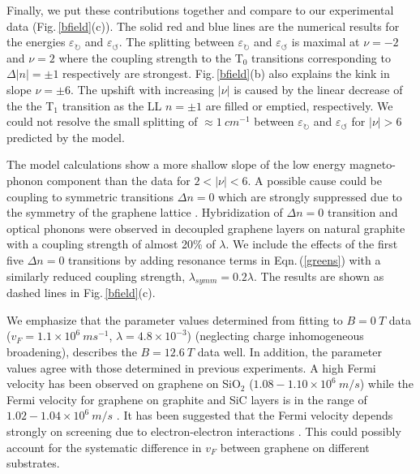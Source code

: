 \documentclass[prl,aps,superscriptaddress,showpacs,reprint]{revtex4-1}
\begin{document}
Finally,  we put these contributions together and compare to our experimental data (Fig.\,\ref{bfield}(c)). The solid red and blue lines are the numerical results for the energies $\varepsilon_\circlearrowright$ and $\varepsilon_\circlearrowleft$.
The splitting between $\varepsilon_\circlearrowright$ and $\varepsilon_\circlearrowleft$ is maximal at $\nu=-2$ and $\nu=2$ where the coupling strength to the T$_0$ transitions corresponding to $\Delta|n|=\pm1$ respectively are strongest. Fig.\,\ref{bfield}(b) also explains the kink in slope $\nu=\pm6$.  The upshift with increasing $|\nu|$  is  caused by the linear decrease of the the T$_1$ transition as the LL $n=\pm1 $ are filled or emptied, respectively. We could not resolve the small splitting of $\approx 1\: cm^{-1}$ between $\varepsilon_\circlearrowright$ and $\varepsilon_\circlearrowleft$ for $\left|\nu\right|>6$ predicted by the model.

The model calculations show a more shallow slope of the low energy magneto-phonon component than the data for $2 < \left|\nu\right| < 6$. A possible cause could be coupling to symmetric transitions $\Delta n = 0$ which are strongly suppressed due to the symmetry of the graphene lattice \cite{PhysRevB.84.235138}. Hybridization of $\Delta n =0$ transition and optical phonons were observed in decoupled graphene layers on natural graphite \cite{faugeras2011magneto,kuhne2012polarization} with a coupling strength of almost 20\% of $\lambda$. We include the effects of the first five $\Delta n = 0$ transitions by adding resonance terms in Eqn.\,(\ref{greens}) with a similarly reduced coupling strength, $\lambda_{symm} =0.2\lambda$. The results are shown as dashed lines in Fig.\,\ref{bfield}(c).

We emphasize that the parameter values determined from fitting to $B=0\: T$ data ($v_F=1.1\times 10^6\: ms^{-1}$, $\lambda=4.8\times 10^{-3}$)  (neglecting charge inhomogeneous broadening), describes the $B=12.6\: T$ data well. In addition, the parameter values agree with those determined in previous experiments. A high Fermi velocity has been observed on graphene on SiO$_2$ ($1.08-1.10\times 10^6\: m/s$) \cite{PhysRevLett.110.227402,kossacki2012circular} while the Fermi velocity for graphene on graphite and SiC layers is in the range  of $1.02-1.04\times 10^6\: m/s$ \cite{faugeras2009tuning,kuhne2012polarization}. It has been suggested that the Fermi velocity depends strongly on screening due to electron-electron interactions \cite{hwang2012fermi}. This could possibly account for the systematic difference in $v_F$ between graphene on different substrates.
\end{document}
